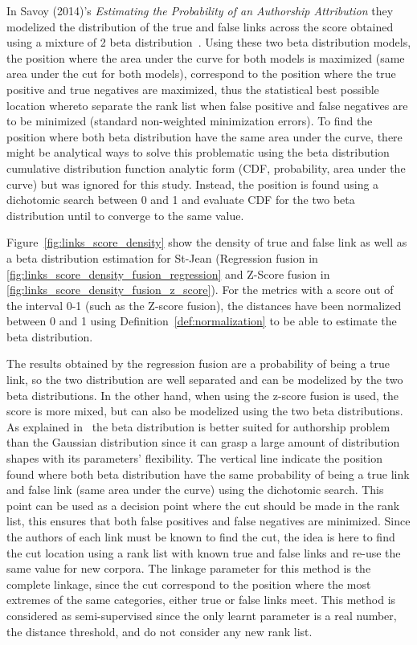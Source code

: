 In Savoy (2014)'s \textit{Estimating the Probability of an Authorship Attribution} they modelized the distribution of the true and false links across the score obtained using a mixture of 2 beta distribution~\cite{savoy_probability}.
Using these two beta distribution models, the position where the area under the curve for both models is maximized (same area under the cut for both models), correspond to the position where the true positive and true negatives are maximized, thus the statistical best possible location whereto separate the rank list when false positive and false negatives are to be minimized (standard non-weighted minimization errors).
To find the position where both beta distribution have the same area under the curve, there might be analytical ways to solve this problematic using the beta distribution cumulative distribution function analytic form (CDF, probability, area under the curve) but was ignored for this study.
Instead, the position is found using a dichotomic search between 0 and 1 and evaluate CDF for the two beta distribution until to converge to the same value.

Figure~\ref{fig:links_score_density} show the density of true and false link as well as a beta distribution estimation for St-Jean (Regression fusion in \ref{fig:links_score_density_fusion_regression} and Z-Score fusion in \ref{fig:links_score_density_fusion_z_score}).
For the metrics with a score out of the interval 0-1 (such as the Z-score fusion), the distances have been normalized between 0 and 1 using Definition~\ref{def:normalization} to be able to estimate the beta distribution.

The results obtained by the regression fusion are a probability of being a true link, so the two distribution are well separated and can be modelized by the two beta distributions.
In the other hand, when using the z-score fusion is used, the score is more mixed, but can also be modelized using the two beta distributions.
As explained in~\cite{savoy_probability} the beta distribution is better suited for authorship problem than the Gaussian distribution since it can grasp a large amount of distribution shapes with its parameters' flexibility.
The vertical line indicate the position found where both beta distribution have the same probability of being a true link and false link (same area under the curve) using the dichotomic search.
This point can be used as a decision point where the cut should be made in the rank list, this ensures that both false positives and false negatives are minimized.
Since the authors of each link must be known to find the cut, the idea is here to find the cut location using a rank list with known true and false links and re-use the same value for new corpora.
The linkage parameter for this method is the complete linkage, since the cut correspond to the position where the most extremes of the same categories, either true or false links meet.
This method is considered as semi-supervised since the only learnt parameter is a real number, the distance threshold, and do not consider any new rank list.

